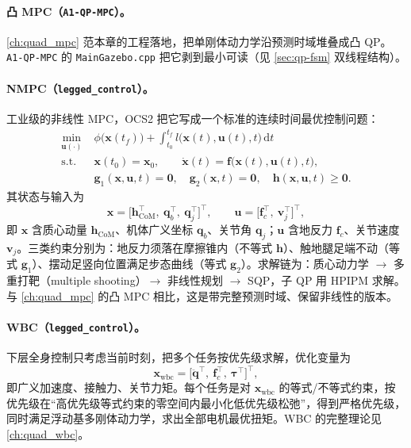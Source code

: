 \paragraph{凸 MPC（\texttt{A1-QP-MPC}）。}
\cref{ch:quad_mpc} 范本章的工程落地，把单刚体动力学沿预测时域堆叠成凸 QP。\texttt{A1-QP-MPC} 的 \texttt{MainGazebo.cpp} 把它剥到最小可读（见 \cref{sec:qp-fsm} 双线程结构）。

\paragraph{NMPC（\texttt{legged\_control}）。}
工业级的非线性 MPC，OCS2 把它写成一个标准的连续时间最优控制问题\cite{sleiman2021unified}：
\begin{equation}
\begin{aligned}
  \min_{\boldsymbol{u}(\cdot)}\;& \phi\big(\boldsymbol{x}(t_f)\big)+\int_{t_0}^{t_f} l\big(\boldsymbol{x}(t),\boldsymbol{u}(t),t\big)\,\mathrm{d}t\\
  \text{s.t.}\;& \boldsymbol{x}(t_0)=\boldsymbol{x}_0,\qquad \dot{\boldsymbol{x}}(t)=\boldsymbol{f}\big(\boldsymbol{x}(t),\boldsymbol{u}(t),t\big),\\
  & \boldsymbol{g}_1(\boldsymbol{x},\boldsymbol{u},t)=\boldsymbol{0},\quad \boldsymbol{g}_2(\boldsymbol{x},t)=\boldsymbol{0},\quad \boldsymbol{h}(\boldsymbol{x},\boldsymbol{u},t)\ge\boldsymbol{0}.
\end{aligned}
\label{eq:qp-nmpc}
\end{equation}
其状态与输入为\cite{sleiman2021unified}
\begin{equation}
  \boldsymbol{x}=\big[\boldsymbol{h}_{\mathrm{CoM}}^\top,\ \boldsymbol{q}_b^\top,\ \boldsymbol{q}_j^\top\big]^\top,
  \qquad
  \boldsymbol{u}=\big[\boldsymbol{f}_c^\top,\ \boldsymbol{v}_j^\top\big]^\top,
  \label{eq:qp-nmpc-state}
\end{equation}
即 $\boldsymbol{x}$ 含质心动量 $\boldsymbol{h}_{\mathrm{CoM}}$、机体广义坐标 $\boldsymbol{q}_b$、关节角 $\boldsymbol{q}_j$；$\boldsymbol{u}$ 含地反力 $\boldsymbol{f}_c$、关节速度 $\boldsymbol{v}_j$。三类约束分别为：地反力须落在摩擦锥内（不等式 $\boldsymbol{h}$）、触地腿足端不动（等式 $\boldsymbol{g}_1$）、摆动足竖向位置满足步态曲线（等式 $\boldsymbol{g}_2$）。求解链为：质心动力学 $\to$ 多重打靶（multiple shooting）$\to$ 非线性规划 $\to$ SQP，子 QP 用 HPIPM 求解\cite{sleiman2021unified}。与 \cref{ch:quad_mpc} 的凸 MPC 相比，这是带完整预测时域、保留非线性的版本。

\paragraph{WBC（\texttt{legged\_control}）。}
下层全身控制只考虑当前时刻，把多个任务按优先级求解，优化变量为\cite{bellicoso2016whole}
\begin{equation}
  \boldsymbol{x}_{\mathrm{wbc}}=\big[\ddot{\boldsymbol{q}}^\top,\ \boldsymbol{f}_c^\top,\ \boldsymbol{\tau}^\top\big]^\top,
  \label{eq:qp-wbc}
\end{equation}
即广义加速度、接触力、关节力矩。每个任务是对 $\boldsymbol{x}_{\mathrm{wbc}}$ 的等式/不等式约束，按优先级在“高优先级等式约束的零空间内最小化低优先级松弛”，得到严格优先级，同时满足浮动基多刚体动力学，求出全部电机最优扭矩\cite{bellicoso2016whole}。WBC 的完整理论见 \cref{ch:quad_wbc}。

